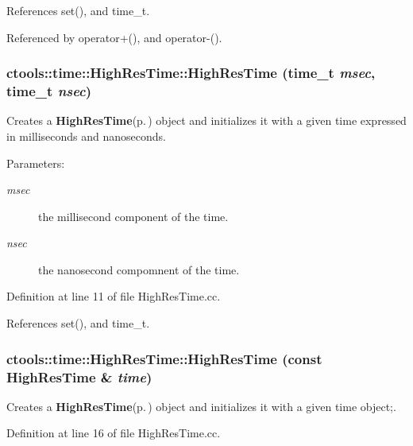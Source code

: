 References set(), and time\_\-t.

Referenced by operator+(), and operator-().
\subsubsection{\setlength{\rightskip}{0pt plus 5cm}ctools::time::High\-Res\-Time::High\-Res\-Time ({\bf time\_\-t} {\em msec}, {\bf time\_\-t} {\em nsec})}\label{classctools_1_1time_1_1HighResTime_a1}


Creates a {\bf High\-Res\-Time}{\rm (p.\,\pageref{classctools_1_1time_1_1HighResTime})} object and initializes it with a given time expressed in milliseconds and nanoseconds. 

\begin{Desc}
\item[Parameters:]
\begin{description}
\item[{\em msec}]the millisecond component of the time. \item[{\em nsec}]the nanosecond compomnent of the time. \end{description}
\end{Desc}


Definition at line 11 of file High\-Res\-Time.cc.

References set(), and time\_\-t.
\subsubsection{\setlength{\rightskip}{0pt plus 5cm}ctools::time::High\-Res\-Time::High\-Res\-Time (const {\bf High\-Res\-Time} \& {\em time})}\label{classctools_1_1time_1_1HighResTime_a2}


Creates a {\bf High\-Res\-Time}{\rm (p.\,\pageref{classctools_1_1time_1_1HighResTime})} object and initializes it with a given time object;. 



Definition at line 16 of file High\-Res\-Time.cc.
